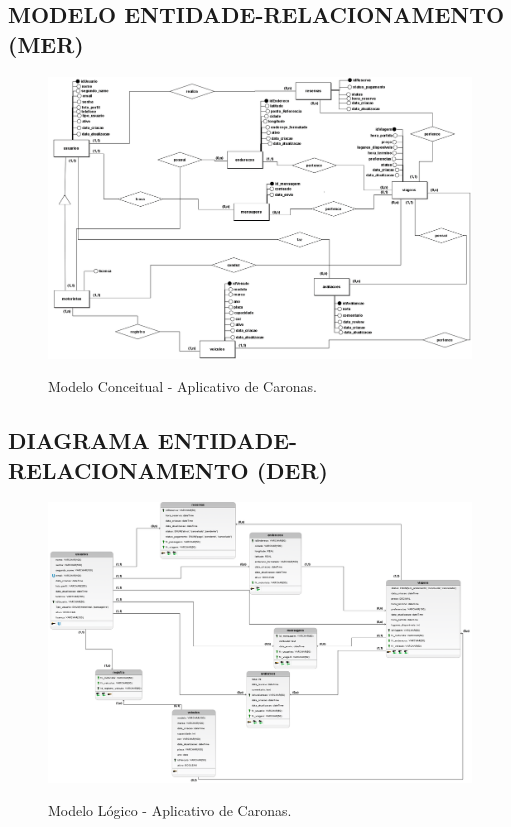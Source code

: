 \begin{anexosenv}


\begin{landscape}

	\chapter{MODELO ENTIDADE-RELACIONAMENTO (MER)}
	
	\begin{figure}[htb!]
		\centering
		\caption{Modelo Conceitual - Aplicativo de Caronas.}
		\includegraphics[width=1.45\textwidth]{img/ModeloConceitualIntegradoredit.png} 
		\label{fig:modelo_conceitual_banco}
	\end{figure}
	
\end{landscape}


\begin{landscape}
	
	\chapter{DIAGRAMA ENTIDADE-RELACIONAMENTO (DER)}
	
	\begin{figure}[htb!]
		\centering
		\caption{Modelo Lógico - Aplicativo de Caronas.}
		\includegraphics[width=1.45\textwidth]{img/ModeloLogicoIntegradoredit.png}
		\label{fig:modelo_logico_banco}
	\end{figure}
	

\end{landscape}
\end{anexosenv}

